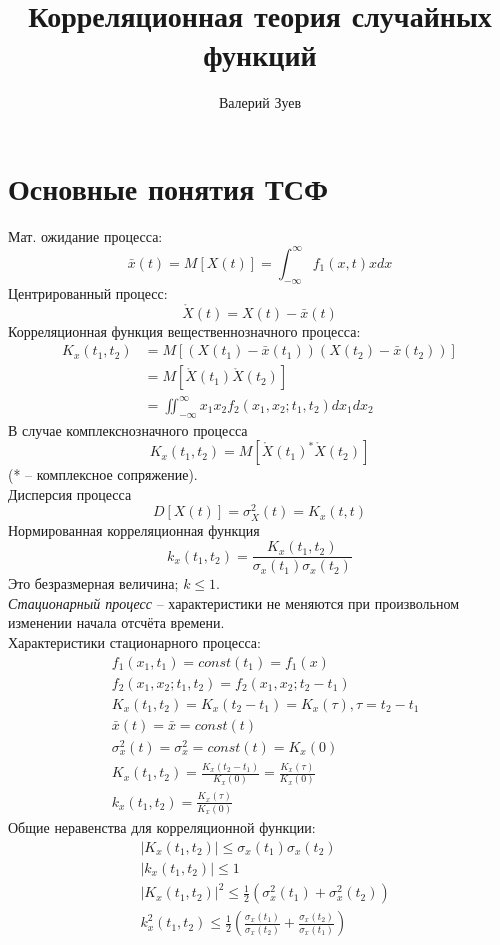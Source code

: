 \documentclass[a4paper,11pt, twocolumn]{article}
\begin{document}
\title{Корреляционная теория случайных функций}
\author{Валерий Зуев}
\maketitle

\section{Основные понятия ТСФ}
Мат. ожидание процесса:
$$ \bar x(t) = M[X(t)] = \int_{-\infty}^{\infty} f_1(x,t)xdx $$
Центрированный процесс:
$$ \mathring X (t) = X(t) - \bar x(t)  $$
Корреляционная функция вещественнозначного процесса:
\begin{align*}
    K_x(t_1, t_2) & = M[(X(t_1)-\bar x(t_1))(X(t_2)-\bar x(t_2))] \\
                  & = M[\mathring X(t_1) \mathring{X}(t_2)] \\
                  & = \iint_{-\infty}^{\infty} x_1 x_2 f_2(x_1,x_2;t_1,t_2) dx_1 dx_2
\end{align*}
В случае комплекснозначного процесса
$$ K_x(t_1, t_2) = M[\mathring X(t_1)^* \mathring{X}(t_2)] $$
(* -- комплексное сопряжение). \\

Дисперсия процесса
$$ D[X(t)] = \sigma^2_X(t) = K_x(t,t) $$
Нормированная корреляционная функция
$$ k_x(t_1,t_2)=\frac{K_x(t_1,t_2)}{\sigma_x(t_1) \sigma_x(t_2)} $$
Это безразмерная величина; $ k \le 1 $. \\

\emph{Стационарный процесс} -- характеристики не меняются при произвольном изменении начала отсчёта времени. \\
Характеристики стационарного процесса:
\begin{align*}
    & f_1(x_1,t_1)=const(t_1)=f_1(x) \\
    & f_2(x_1,x_2;t_1,t_2) = f_2(x_1,x_2;t_2-t_1) \\
    & K_x(t_1,t_2) = K_x(t_2 - t_1) = K_x(\tau), \tau = t_2-t_1 \\
    & \bar x(t) = \bar x = const(t) \\
    & \sigma_x^2(t) = \sigma_x^2 = const(t) = K_x(0) \\
    & K_x(t_1, t_2) = \frac{K_x(t_2-t_1)}{K_x(0)} = \frac{K_x(\tau)}{K_x(0)} \\
    & k_x(t_1, t_2) = \frac{K_x(\tau)}{K_x(0)}
\end{align*}
Общие неравенства для корреляционной функции:
\begin{align*}
    & |K_x(t_1, t_2)| \le \sigma_x(t_1) \sigma_x(t_2) \\
    & |k_x(t_1, t_2)| \le 1 \\
    & |K_x(t_1,t_2)|^2 \le \frac{1}{2}\left( \sigma_x^2(t_1) + \sigma_x^2(t_2) \right) \\
    & k_x^2(t_1,t_2) \le \frac{1}{2} \left( \frac{\sigma_x(t_1)}{\sigma_x(t_2)} + \frac{\sigma_x(t_2)}{\sigma_x(t_1)} \right)
\end{align*}
\end{document}
